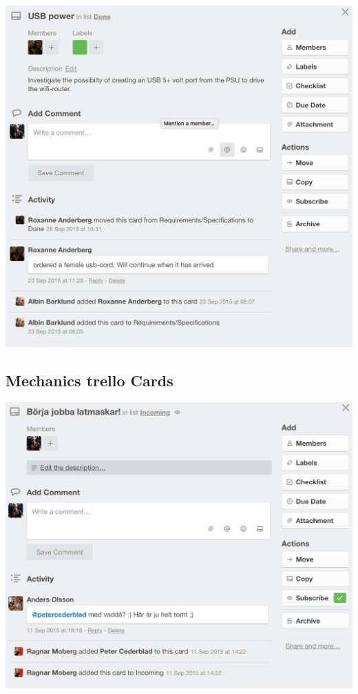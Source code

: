     \includegraphics[scale=0.5]{Screenshoot23}



\newpage
\subsection{Mechanics trello Cards}

    \includegraphics[scale=0.5]{Screenshoot24}

